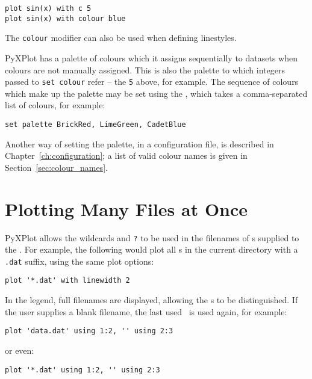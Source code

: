 \begin{verbatim}
plot sin(x) with c 5
plot sin(x) with colour blue
\end{verbatim}

\noindent The {\tt colour} modifier can also be used when defining linestyles.

 PyXPlot has a palette of
colours which it assigns sequentially to datasets when colours are not manually
assigned. This is also the palette to which integers passed to {\tt set colour}
refer -- the {\tt 5} above, for example. The sequence of colours which make up
the palette may be set using the , which takes a
comma-separated list of colours, for example:

\begin{verbatim}
set palette BrickRed, LimeGreen, CadetBlue
\end{verbatim}

\noindent Another way of setting the palette, in a configuration file, is
described in Chapter~\ref{ch:configuration}; a list of valid colour names is
given in Section~\ref{sec:colour_names}.

\section{Plotting Many Files at Once}


PyXPlot allows the wildcards {\tt *} and {\tt ?} to be used in the filenames of
\datafile s supplied to the .  For example, the following would
plot all \datafile s in the current directory with a {\tt .dat} suffix, using
the same plot options:

\begin{verbatim}
plot '*.dat' with linewidth 2
\end{verbatim}

\noindent In the legend, full filenames are displayed, allowing the \datafile s
to be distinguished. If the user supplies a blank filename, the last used
\datafile\ is used again, for example:

\begin{verbatim}
plot 'data.dat' using 1:2, '' using 2:3
\end{verbatim}

\noindent or even:

\begin{verbatim}
plot '*.dat' using 1:2, '' using 2:3
\end{verbatim}

